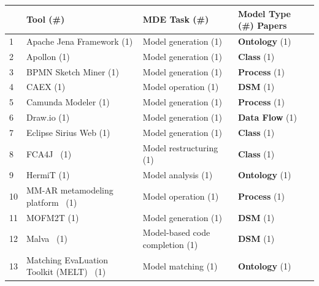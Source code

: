 \begin{tabular} { p{} p{} p{} p{} } \\ 
\toprule 
 & Tool (\#) & MDE Task (\#) & Model Type (\#) Papers \\ 
\midrule  
1& Apache Jena Framework (1) & \cellcolor[HTML]{D1F1E3}Model generation (1) & \textbf{Ontology} (1) \cite{ \paperonehundredseventieth }\\ 
\rowcolor{gray!15} 
2& Apollon (1) & \cellcolor[HTML]{D1F1E3}Model generation (1) & \textbf{Class} (1) \cite{ \papertwohundredninth }\\ 
3& BPMN Sketch Miner (1) & \cellcolor[HTML]{D1F1E3}Model generation (1) & \textbf{Process} (1) \cite{ \paperninetyfirst }\\ 
\rowcolor{gray!15} 
4& CAEX (1) & \cellcolor[HTML]{CFEFF4}Model operation (1) & \textbf{DSM} (1) \cite{ \paperonehundredfortyninth }\\ 
5& Camunda Modeler (1) & \cellcolor[HTML]{D1F1E3}Model generation (1) & \textbf{Process} (1) \cite{ \papertwentyseventh }\\ 
\rowcolor{gray!15} 
6& Draw.io (1) & \cellcolor[HTML]{D1F1E3}Model generation (1) & \textbf{Data Flow} (1) \cite{ \paperonehundredthirtyfirst }\\ 
7& Eclipse Sirius Web (1) & \cellcolor[HTML]{D1F1E3}Model generation (1) & \textbf{Class} (1) \cite{ \papertwohundredsixteenth }\\ 
\rowcolor{gray!15} 
8& FCA4J~\cite{gutierrez2022fca4j} (1) & \cellcolor[HTML]{E3E9FE}Model restructuring (1) & \textbf{Class} (1) \cite{ \papertwohundredtwentyfifth }\\ 
9& HermiT (1) & \cellcolor[HTML]{F2E9D4}Model analysis (1) & \textbf{Ontology} (1) \cite{ \papertwohundredfortyseventh }\\ 
\rowcolor{gray!15} 
10& MM-AR metamodeling platform~\cite{muff2026mm} (1) & \cellcolor[HTML]{CFEFF4}Model operation (1) & \textbf{Process} (1) \cite{ \papertwohundredfortysixth }, \textbf{Value} (1) \cite{ \papertwohundredfortysixth }\\ 
11& MOFM2T (1) & \cellcolor[HTML]{D1F1E3}Model generation (1) & \textbf{DSM} (1) \cite{ \paperonehundredtwentyseventh }\\ 
\rowcolor{gray!15} 
12& Malva~\cite{bainczyk2023simplicity} (1) & \cellcolor[HTML]{FFE2E8}Model-based code completion (1) & \textbf{DSM} (1) \cite{ \paperonehundredsecond }\\ 
13& Matching EvaLuation Toolkit (MELT)~\cite{hertling2019melt} (1) & \cellcolor[HTML]{CDF1E9}Model matching (1) & \textbf{Ontology} (1) \cite{ \paperonehundredthirtysecond }\\ 

\end{tabular}
